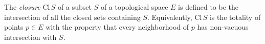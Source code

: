 The \textit{closure} $\text{Cl}\, S$ of a subset $S$ of a topological space $E$ is defined to be the intersection of all the closed sets containing $S$. Equivalently, $\text{Cl}\, S$ is the totality of points $p \in E$ with the property that every neighborhood of $p$ has non-vacuous intersection with $S$.
